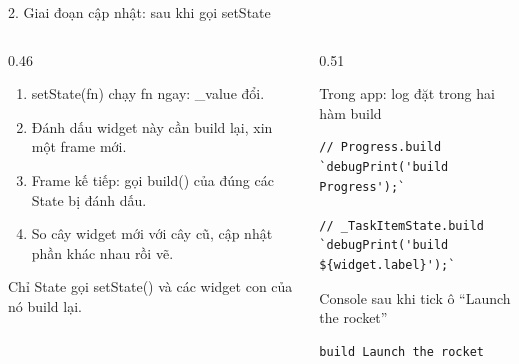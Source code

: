 \documentclass[aspectratio=169,11pt]{beamer}
\newcommand{\ma}[1]{{\ttfamily\small #1}}
\newcommand{\chot}[1]{%
  \par\vspace{2.5mm}%
  \colorbox{nenhop}{\parbox{\dimexpr\linewidth-2\fboxsep\relax}{\raggedright\small\color{chinh}#1}}}
\newcommand{\nhanma}[1]{{\scriptsize\color{xam}#1\par}\vspace{0.8mm}}
\begin{document}
\begin{frame}[fragile]{2. Giai đoạn cập nhật: sau khi gọi setState}
  \begin{columns}[T,onlytextwidth]
    \begin{column}{0.46\textwidth}
      \begin{enumerate}
        \item \ma{setState(fn)} chạy \ma{fn} ngay: \ma{\_value} đổi.
        \item Đánh dấu widget này cần build lại, xin một frame mới.
        \item Frame kế tiếp: gọi \ma{build()} của đúng các State bị đánh dấu.
        \item So cây widget mới với cây cũ, cập nhật phần khác nhau rồi vẽ.
      \end{enumerate}
      \chot{Chỉ State gọi \ma{setState()} và các widget con của nó build lại.}
    \end{column}
    \begin{column}{0.51\textwidth}
      \nhanma{Trong app: log đặt trong hai hàm build}
\begin{lstlisting}
// Progress.build
`debugPrint('build Progress');`

// _TaskItemState.build
`debugPrint('build ${widget.label}');`
\end{lstlisting}
      \vspace{2.5mm}
      \nhanma{Console sau khi tick ô ``Launch the rocket''}
\begin{lstlisting}[style=log]
build Launch the rocket
\end{lstlisting}
    \end{column}
  \end{columns}
\end{frame}
\end{document}
